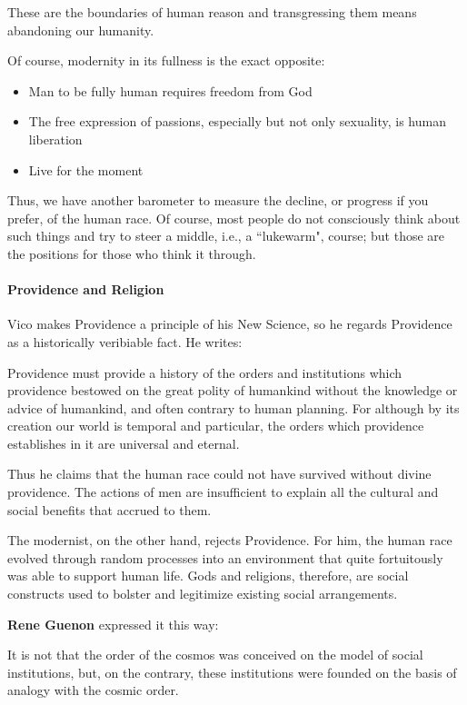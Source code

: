 \begin{quotex}
These are the boundaries of human reason and transgressing them means abandoning our humanity. 

\end{quotex}
Of course, modernity in its fullness is the exact opposite:

\begin{itemize}
\item Man to be fully human requires freedom from God 
\item The free expression of passions, especially but not only sexuality, is human liberation 
\item Live for the moment 
\end{itemize}
Thus, we have another barometer to measure the decline, or progress if you prefer, of the human race. Of course, most people do not consciously think about such things and try to steer a middle, i.e., a ``lukewarm", course; but those are the positions for those who think it through.

\paragraph{Providence and Religion}
Vico makes Providence a principle of his New Science, so he regards Providence as a historically veribiable fact. He writes:

\begin{quotex}
Providence must provide a history of the orders and institutions which providence bestowed on the great polity of humankind without the knowledge or advice of humankind, and often contrary to human planning. For although by its creation our world is temporal and particular, the orders which providence establishes in it are universal and eternal. 

\end{quotex}
Thus he claims that the human race could not have survived without divine providence. The actions of men are insufficient to explain all the cultural and social benefits that accrued to them.

The modernist, on the other hand, rejects Providence. For him, the human race evolved through random processes into an environment that quite fortuitously was able to support human life. Gods and religions, therefore, are social constructs used to bolster and legitimize existing social arrangements.

\textbf{Rene Guenon} expressed it this way:

\begin{quotex}
It is not that the order of the cosmos was conceived on the model of social institutions, but, on the contrary, these institutions were founded on the basis of analogy with the cosmic order. 

\end{quotex}
